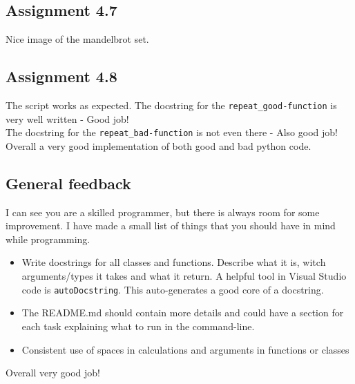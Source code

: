 \documentclass[a4paper]{article}
\begin{document}
\subsection*{Assignment 4.7}
Nice image of the mandelbrot set.

\subsection*{Assignment 4.8}
The script works as expected.
\newline\newline
The docstring for the \texttt{repeat\_good-function} is very well written - Good job!\\
The docstring for the \texttt{repeat\_bad-function} is not even there - Also good job!
\newline\newline
Overall a very good implementation of both good and bad python code.



\subsection*{General feedback}
I can see you are a skilled programmer, but there is always room for some improvement. I have made a small list of things that you should have in mind while programming.

\begin{itemize}
    \item Write docstrings for all classes and functions. Describe what it is, witch arguments/types it takes and what it return. A helpful tool in Visual Studio code is \texttt{autoDocstring}. This auto-generates a good core of a docstring.
    \item The README.md should contain more details and could have a section for each task explaining what to run in the command-line.
    \item Consistent use of spaces in calculations and arguments in functions or classes
\end{itemize}
\newline
Overall very good job!





\end{document}
